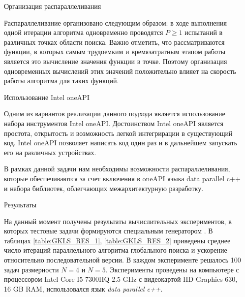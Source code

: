 \documentclass{beamer}
\begin{document}
\begin{frame}[t]
\begin{columns}[t]
\begin{column}[t]{0.48\paperwidth}
        \end{column}
        \begin{column}[t]{0.48\paperwidth}
          \begin{block}{Организация распараллеливания}

Распараллеливание организовано следующим образом: в ходе выполнения одной итерации алгоритма одновременно проводятся \(P \geq 1\) испытаний в различных точках области поиска. Важно отметить, что рассматриваются функции, в которых самым трудоемким и времязатратным этапом работы является это вычисление значения функции в точке. Поэтому организация одновременных вычислений этих значений положительно влияет на скорость работы алгоритма для таких функций. 


\end{block}

\begin{block}{Использование Intel oneAPI}

Одним из вариантов реализации данного подхода является использование набора инструментов Intel oneAPI. Достоинством Intel oneAPI является простота, открытость и возможность легкой интегрирации в существующий код. Intel oneAPI позволяет написать код один раз и в дальнейшем запускать его на различных устройствах. 

В рамках данной задачи нам необходимы возможности распараллеливания, которые обеспечиваются за счет включения в oneAPI языка data parallel c++ и набора библиотек, облегчающих межархитектурную разработку.  


\end{block}

\begin{block}{Результаты}

На данный момент получены результаты вычислительных экспериментов, в которых тестовые задачи формируются специальным генератором \cite{GKLS}. В таблицах \ref{table:GKLS_RES_1}, \ref{table:GKLS_RES_2} приведены среднее число итераций параллельного алгоритма глобального поиска и ускорение относительно последовательной версии. В каждом эксперименте решалось 100 задач размерности \(N = 4\) и \(N = 5\). Эксперименты проведены на компьютере с процессором Intel Core I5-7300HQ 2.5 GHz с видеокартой HD Graphics 630, 16 GB RAM, использовался язык \textit{data parallel c++}.




\end{block}
\end{column}
\end{columns}
\end{frame}
\end{document}

